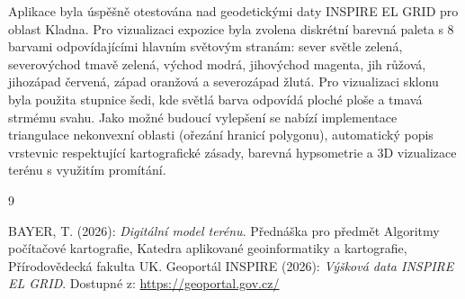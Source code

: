 \documentclass[11pt, a4paper]{article}
\begin{document}
Aplikace byla úspěšně otestována nad geodetickými daty INSPIRE EL GRID pro oblast Kladna. Pro vizualizaci expozice byla zvolena diskrétní barevná paleta s 8 barvami odpovídajícími hlavním světovým stranám: sever světle zelená, severovýchod tmavě zelená, východ modrá, jihovýchod magenta, jih růžová, jihozápad červená, západ oranžová a severozápad žlutá. Pro vizualizaci sklonu byla použita stupnice šedi, kde světlá barva odpovídá ploché ploše a tmavá strmému svahu. Jako možné budoucí vylepšení se nabízí implementace triangulace nekonvexní oblasti (ořezání hranicí polygonu), automatický popis vrstevnic respektující kartografické zásady, barevná hypsometrie a 3D vizualizace terénu s využitím promítání.

\newpage
\renewcommand{\refname}{Zdroje} 
\begin{thebibliography}{9}

 BAYER, T. (2026): \textit{Digitální model terénu}. Přednáška pro předmět Algoritmy počítačové kartografie, Katedra aplikované geoinformatiky a kartografie, Přírodovědecká fakulta UK.
 Geoportál INSPIRE (2026): \textit{Výšková data INSPIRE EL GRID}. Dostupné z: \url{https://geoportal.gov.cz/}

\end{thebibliography}
\end{document}
